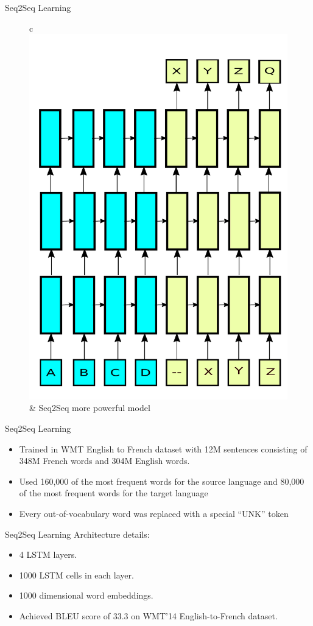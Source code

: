 ﻿\documentclass[table,aspectratio=43,mathserif,xcolor={usenames,dvipsnames,svgnames,table},10pt]{beamer}
\renewcommand{\footnotesize}{\tiny}
\begin{document}
\begin{frame}{Seq2Seq Learning}
 \begin{figure}
    \centering
    \begin{tabular}{c}
	\includegraphics[width=.49\linewidth]{images/seq2seq_deep.pdf} &
	\footnotesize Seq2Seq more powerful model \\
    \end{tabular}
    \end{figure}
\end{frame}


\begin{frame}{Seq2Seq Learning}
\begin{itemize}
 \item<+->  Trained in WMT English to French dataset with 12M sentences consisting of 348M French words and 304M English words.
 \item<+->  Used 160,000 of the most frequent words for the source language and 80,000 of the most frequent words for the target language
 \item<+->  Every out-of-vocabulary word was replaced with a special “UNK” token
\end{itemize}
\end{frame}

\begin{frame}{Seq2Seq Learning}
 Architecture details:
\begin{itemize}
 \item<+->  4 LSTM layers.
 \item<+->  1000 LSTM cells in each layer.
 \item<+->  1000 dimensional word embeddings.
 \item<+->  Achieved BLEU score of 33.3 on WMT’14 English-to-French dataset.
\end{itemize}
\end{frame}
\end{document}
